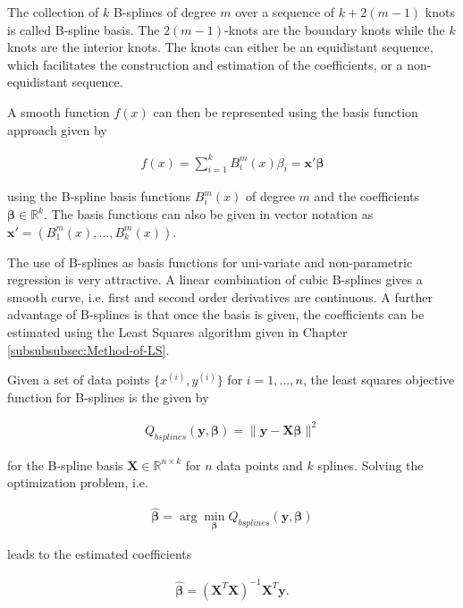 \documentclass[10pt,a4paper]{article}
\begin{document}
The collection of $k$ B-splines of degree $m$ over a sequence of $k+2(m-1)$ knots is called B-spline basis. The $2(m-1)$-knots are the boundary knots while the $k$ knots are the interior knots. The knots can either be an equidistant sequence, which facilitates the construction and estimation of the coefficients, or a non-equidistant sequence. \cite{eilers1996flexible}

A smooth function $f(x)$ can then be represented using the basis function approach given by

\begin{align} \label{eq:bspline_bf_approach}
	f(x) = \sum_{i=1}^k B_i^m(x) \beta_i = \boldsymbol{x}' \boldsymbol{\beta}
\end{align}

using the B-spline basis functions $B_i^m(x)$  of degree $m$ and the coefficients $\boldsymbol{\beta} \in \mathbb{R}^{k}$. The basis functions can also be given in vector notation as $\boldsymbol{x}' = (B_1^m(x), \dots, B_k^m(x))$. 

The use of B-splines as basis functions for uni-variate and non-parametric regression is very attractive. A linear combination of cubic B-splines gives a smooth curve, i.e. first and second order derivatives are continuous. A further advantage of B-splines is that once the basis is given, the coefficients can be estimated using the Least Squares algorithm given in Chapter \ref{subsubsubsec:Method-of-LS}. 

Given a set of data points $\{x^{(i)}, y^{(i)}\}$ for $i = 1, \dots, n$, the least squares objective function for B-splines is the given by

\begin{align} \label{eq:OF_Bsplines}
	Q_{bsplines}(\boldsymbol{y}, \boldsymbol{\beta}) = \lVert \boldsymbol{y} - \boldsymbol{X} \boldsymbol{\beta} \rVert^2
\end{align}

for the B-spline basis $\boldsymbol{X} \in \mathbb{R}^{n \times k}$ for $n$ data points and $k$ splines. Solving the optimization problem, i.e.

\begin{align} \label{eq:opti_problem_bsplines}
	\boldsymbol{\hat{\beta}} = \arg \min_{\boldsymbol{\beta}} Q_{bsplines}(\boldsymbol{y}, \boldsymbol{\beta})
\end{align}

leads to the estimated coefficients 

\begin{align}
	\boldsymbol{\hat{\beta}} = (\boldsymbol{X}^T \boldsymbol{X})^{-1} \boldsymbol{X}^T \boldsymbol{y}.
\end{align}
\end{document}
